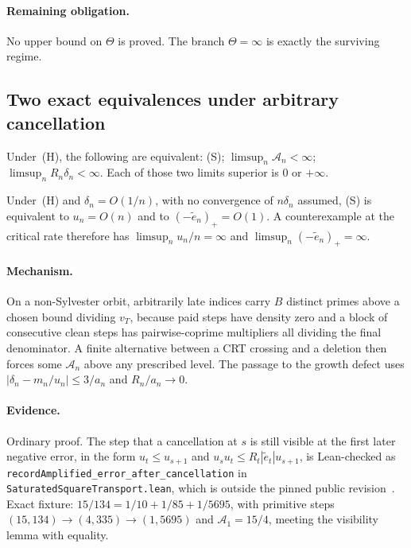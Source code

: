 \paragraph{Remaining obligation.}
No upper bound on $\Theta$ is proved.  The branch $\Theta=\infty$ is exactly the
surviving regime.

\subsection{Two exact equivalences under arbitrary cancellation}

\begin{theorem}\label{long243:res:recordamplified}
Under~(H), the following are equivalent: (S); $\limsup_n\mathcal A_n<\infty$;
$\limsup_nR_n\delta_n<\infty$.  Each of those two limits superior is $0$ or
$+\infty$.
\end{theorem}

\begin{corollary}\label{long243:res:criticalrate}
Under~(H) and $\delta_n=O(1/n)$, with no convergence of $n\delta_n$ assumed,
(S) is equivalent to $u_n=O(n)$ and to $(-\tilde e_n)_+=O(1)$.  A
counterexample at the critical rate therefore has $\limsup_nu_n/n=\infty$ and
$\limsup_n(-\tilde e_n)_+=\infty$.
\end{corollary}

\paragraph{Mechanism.}
On a non-Sylvester orbit, arbitrarily late indices carry $B$ distinct primes
above a chosen bound dividing $v_T$, because paid steps have density zero and a
block of consecutive clean steps has pairwise-coprime multipliers all dividing
the final denominator.  A finite alternative between a CRT crossing and a
deletion then forces some $\mathcal A_n$ above any prescribed level.  The passage to the
growth defect uses $|\delta_n-m_n/u_n|\le3/a_n$ and $R_n/a_n\to0$.

\paragraph{Evidence.}
Ordinary proof.  The step that a cancellation at $s$ is still visible at the
first later negative error, in the form $u_t\le u_{s+1}$ and
$u_su_t\le R_t|\tilde e_t|u_{s+1}$, is Lean-checked as
\texttt{recordAmplified\_error\_after\_cancellation} in
\texttt{SaturatedSquareTransport.lean}, which is outside the pinned public
revision~\commitshort.  Exact fixture: $15/134=1/10+1/85+1/5695$, with primitive
steps $(15,134)\to(4,335)\to(1,5695)$ and $\mathcal A_1=15/4$, meeting the
visibility lemma with equality.

